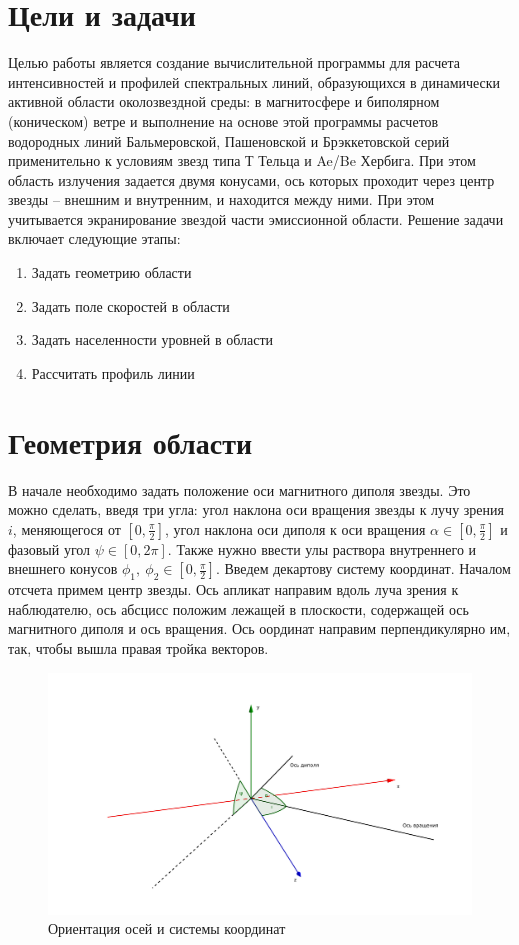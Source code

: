 \documentclass{article}
\begin{document}
\section{Цели и задачи}

Целью работы является создание вычислительной программы для расчета интенсивностей и профилей спектральных линий, образующихся в динамически 
активной области околозвездной среды: в магнитосфере и биполярном (коническом) ветре и выполнение на основе этой программы расчетов водородных линий 
Бальмеровской, Пашеновской и Брэккетовской серий применительно к условиям звезд типа Т Тельца и Ae/Be Хербига. 
При этом область излучения задается двумя конусами, 
ось которых проходит через центр звезды -- внешним и внутренним, и находится между ними. 
При этом учитывается экранирование звездой части эмиссионной области. Решение задачи включает следующие этапы:
\begin{enumerate}
\item Задать геометрию области
\item Задать поле скоростей в области
\item Задать населенности уровней в области
\item Рассчитать профиль линии
\end{enumerate}   

\section{Геометрия области}

В начале необходимо задать положение оси магнитного диполя звезды. Это можно сделать, введя три угла: угол наклона оси вращения звезды к лучу зрения $i$, меняющегося от $\left[0,\frac{\pi}{2}\right]$, угол наклона оси диполя к оси вращения $\alpha \in \left[0,\frac{\pi}{2}\right]$  и фазовый угол $\psi \in \left[0,2\pi\right]$. Также нужно ввести улы раствора внутреннего и внешнего конусов $\phi_1,\ \phi_2 \in \left[0,\frac{\pi}{2}\right]$. 
Введем декартову систему координат. Началом отсчета примем центр звезды. Ось апликат направим вдоль луча зрения к наблюдателю, ось абсцисс положим лежащей в плоскости, содержащей ось магнитного диполя и ось вращения. Ось оординат направим перпендикулярно им, так, чтобы вышла правая тройка векторов. 

\begin{figure} [h]
    \centering
    \includegraphics[width=1\textwidth]{geom}
    \caption{Ориентация осей и системы координат}
\end{figure}
\end{document}
